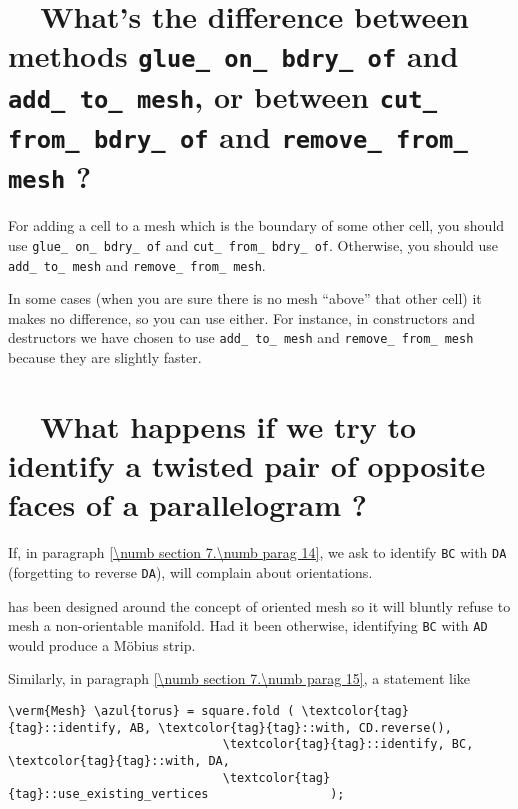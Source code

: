 \section{~~What's the difference between methods {\tt glue\_\,on\_\,bdry\_\,of} and
  {\tt add\_\,to\_\,mesh}, or between {\tt cut\_\,from\_\,bdry\_\,of} and
  {\tt remove\_\,from\_\,mesh} ?}
\label{\numb section 13.\numb parag 4}

For adding a cell to a mesh which is the boundary of some other cell,
you should use {\small\tt glue\_\,on\_\,bdry\_\,of} and {\small\tt cut\_\,from\_\,bdry\_\,of}.
Otherwise, you should use {\small\tt add\_\,to\_\,mesh} and {\small\tt remove\_\,from\_\,mesh}.

In some cases (when you are sure there is no mesh ``above'' that other cell)
it makes no difference, so you can use either.
For instance, in {\small\tt{}} constructors and destructors
we have chosen to use {\small\tt add\_\,to\_\,mesh} and {\small\tt remove\_\,from\_\,mesh}
because they are slightly faster.


\section{~~What happens if we try to identify a twisted pair of
           opposite faces of a parallelogram ?}
\label{\numb section 13.\numb parag 5}

If, in paragraph \ref{\numb section 7.\numb parag 14}, we ask {\maniFEM} to identify
{\small\tt BC} with {\small\tt DA} (forgetting to reverse {\small\tt DA}),
{\maniFEM} will complain about orientations.

\ManiFEM{} has been designed around the concept of oriented mesh so it will
bluntly refuse to mesh a non-orientable manifold.
Had it been otherwise, identifying {\small\tt BC} with {\small\tt AD}
would produce a M\"obius strip.

Similarly, in paragraph \ref{\numb section 7.\numb parag 15}, a statement like

\begin{Verbatim}[commandchars=\\\{\},formatcom=\small\tt,
   baselinestretch=0.94,framesep=2mm                     ]
   \verm{Mesh} \azul{torus} = square.fold ( \textcolor{tag}{tag}::identify, AB, \textcolor{tag}{tag}::with, CD.reverse(),
                              \textcolor{tag}{tag}::identify, BC, \textcolor{tag}{tag}::with, DA,
                              \textcolor{tag}{tag}::use_existing_vertices                 );
\end{Verbatim}

